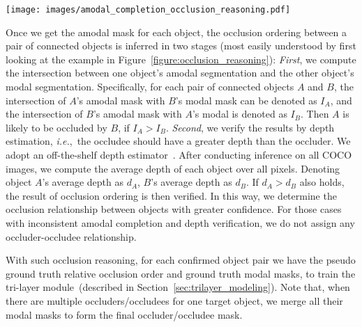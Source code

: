 \documentclass{bmvc2k}
\begin{document}
\begin{figure*}[t]
		\centering
		\texttt{[image: images/amodal\_completion\_occlusion\_reasoning.pdf]}
		\caption{\textcolor{bmvc_blue}{ \textbf{The process of occlusion reasoning via amodal completion and depth estimation.} Left: The original image and its depth map. Right: the amodal completion and depth maps for the two objects: Umbrella and Person. In this case we conclude that the Person occludes the Umbrella since: (i) the amodal umbrella has an overlap with the modal person, but no overlap vice versa; and (ii) the average depth map indicates that the depth of the umbrella is greater than that of the person. In this way, we predict that \textbf{``The umbrella is occluded by the person''.} }
  }
		\label{figure:occlusion_reasoning}
 		\vspace{-6mm}
\end{figure*}

Once we get the amodal mask for each object, 
the occlusion ordering between a pair of connected objects is inferred in two stages (most easily understood by first looking at the example in Figure~\ref{figure:occlusion_reasoning}):
{\em First}, we compute the intersection between one object's amodal segmentation and the other object's modal segmentation. Specifically, for each pair of connected objects $A$ and $B$,
the intersection of $A$'s amodal mask with $B$'s modal mask can be denoted as $I_A$, 
and the intersection of $B$'s amodal mask with $A$'s modal is denoted as $I_B$.
Then $A$ is likely to be occluded by $B$, if $I_A > I_B$.
{\em Second}, we verify the results by depth estimation, 
{\em i.e.},~the occludee should have a greater depth than the occluder. 
We adopt an off-the-shelf depth estimator~\cite{Ranftl2021}. After conducting inference on all COCO images, we compute the average depth of each object over all pixels. Denoting object $A$'s average depth as $d_A$, $B$'s average depth as $d_B$. 
If $d_A > d_B$ also holds, the result of occlusion ordering is then verified. 
In this way, we determine the occlusion relationship between objects with greater confidence.
For those cases with inconsistent amodal completion and depth verification, 
we do not assign any occluder-occludee relationship.

With such occlusion reasoning, for each confirmed object pair
we have the pseudo ground truth relative occlusion order and ground truth modal masks, 
to train the tri-layer module~(described in Section~\ref{sec:trilayer_modeling}).
Note that, when there are multiple occluders/occludees for one target object,
we merge all their modal masks to form the final occluder/occludee mask.
\end{document}
